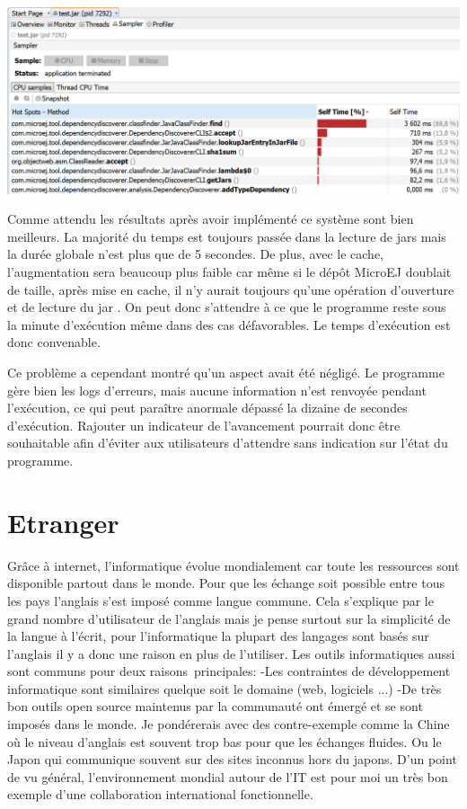 \documentclass[french,a4paper,12pt]{report}
\begin{document}
\begin{center}
\includegraphics[width=\textwidth]{./ressources/images/timeRepartitionByMethodsCachedsheer.png}
\end{center}

Comme attendu les résultats après avoir implémenté ce système sont bien meilleurs.
La majorité du temps est toujours passée dans la lecture de jars mais la durée globale n’est plus que de 5 secondes. De plus, avec le cache, l’augmentation sera beaucoup plus faible car même si le dépôt MicroEJ doublait de taille, après mise en cache, il n’y aurait toujours qu’une opération d’ouverture et de lecture du jar . On peut donc s’attendre à ce que le programme reste sous la minute d’exécution même dans des cas défavorables.  Le temps d’exécution est donc convenable.

Ce problème a cependant montré qu'un aspect avait été négligé. Le programme gère bien les logs d’erreurs, mais aucune information n’est renvoyée pendant l’exécution, ce qui peut paraître anormale dépassé la dizaine de secondes d’exécution. Rajouter un indicateur de l’avancement pourrait donc être souhaitable afin d’éviter aux utilisateurs d’attendre sans indication sur l’état du programme.

\chapter{Etranger}


Grâce à internet, l’informatique évolue mondialement car toute les ressources sont disponible partout dans le monde. Pour que les échange soit possible entre tous les pays  l’anglais s’est imposé comme langue commune. Cela s’explique par le grand nombre d’utilisateur de l’anglais mais je pense surtout sur la simplicité de la langue à l’écrit, pour l’informatique la plupart des langages sont basés sur l’anglais il y a donc une raison en plus de l’utiliser.
Les outils informatiques aussi sont communs pour deux raisons principales:
-Les contraintes de développement informatique sont similaires quelque soit le domaine (web, logiciels ...)
-De très bon outils open source maintenus par la communauté ont émergé et se sont imposés dans le monde.
Je pondérerais avec des contre-exemple comme la Chine où le niveau d’anglais est souvent trop bas pour que les échanges fluides. Ou le Japon qui communique souvent sur des sites inconnus hors du japons. 
D’un point de vu général, l’environnement mondial autour de l’IT est pour moi un très bon exemple d’une collaboration international fonctionnelle.\\
\end{document}
